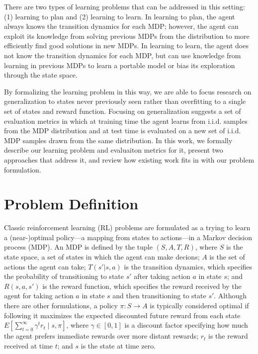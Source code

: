 There are two types of learning problems that can be addressed in this setting: (1) learning to plan and (2) learning to learn. In learning to plan, the agent always knows the transition dynamics for each MDP; however, the agent can exploit its knowledge from solving previous MDPs from the distribution to more efficiently find good solutions in new MDPs. In learning to learn, the agent does not know the transition dynamics for each MDP, but can use knowledge from learning in previous MDPs to learn a portable model or bias its exploration through the state space.

By formalizing the learning problem in this way, we are able to focus research on generalization to states never previously seen rather than overfitting to a single set of states and reward function. Focusing on generalization suggests a set of evaluation metrics in which at training time the agent learns from i.i.d. samples from the MDP distribution and at test time is evaluated on a new set of i.i.d. MDP samples drawn from the same distribution.  In this work, we formally describe our learning problem and evaluaiton metrics for it, present two approaches that address it, and review how existing work fits in with our problem formulation.


\section{Problem Definition}
Classic reinforcement learning (RL) problems are formulated as a trying to learn a (near-)optimal policy---a mapping from states to actions---in a Markov decision process (MDP). An MDP is defined by the tuple $(S, A, T, R)$, where $S$ is the state space, a set of states in which the agent can make decions; $A$ is the set of actions the agent can take; $T(s' | s, a)$ is the transition dynamics, which specifies the probability of transitioning to state $s'$ after taking action $a$ in state $s$; and $R(s, a, s')$ is the reward function, which specifies the reward received by the agent for taking action $a$ in state $s$ and then transitioning to state $s'$. Although there are other formulations, a policy $\pi : S \rightarrow A$ is typically considered optimal if following it maximizes the expected discounted future reward from each state $E \left[ \sum_{t=0}^{\infty} \gamma^t r_t \mid s, \pi \right]$, where $\gamma \in [0, 1]$ is a discount factor specifying how much the agent prefers immediate rewards over more distant rewards; $r_t$ is the reward received at time $t$; and $s$ is the state at time zero.

